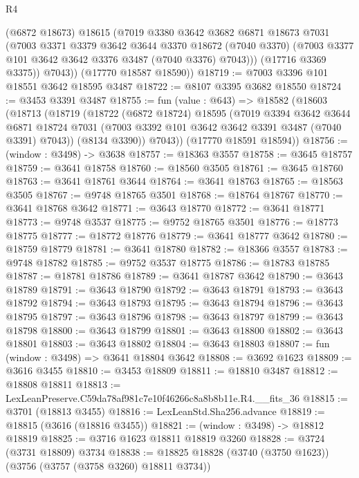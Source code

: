 \begin{lexlean}{R4}
\begin{coremodule}
            (@6872 @18673)
            @18615
            (@7019
              @3380
              @3642
              @3682
              @6871
              @18673
              @7031
              (@7003
                @3371
                @3379
                @3642
                @3644
                @3370
                @18672
                (@7040 @3370)
                (@7003 @3377 @101 @3642 @3642 @3376 @3487 (@7040 @3376) @7043)))
            (@17716 @3369 @3375))
          @7043))
      (@17770 @18587 @18590))
@18719 := @7003 @3396 @101 @18551 @3642 @18595 @3487
@18722 := @8107 @3395 @3682 @18550
@18724 := @3453 @3391 @3487
@18755 := fun (value : @643) =>
  @18582
    (@18603
      (@18713
        (@18719
          (@18722
            (@6872 @18724)
            @18595
            (@7019
              @3394
              @3642
              @3644
              @6871
              @18724
              @7031
              (@7003 @3392 @101 @3642 @3642 @3391 @3487 (@7040 @3391) @7043))
            (@8134 @3390))
          @7043))
      (@17770 @18591 @18594))
@18756 := (window : @3498) -> @3638
@18757 := @18363 @3557
@18758 := @3645 @18757
@18759 := @3641 @18758
@18760 := @18560 @3505
@18761 := @3645 @18760
@18763 := @3641 @18761 @3644
@18764 := @3641 @18763
@18765 := @18563 @3505
@18767 := @9748 @18765 @3501
@18768 := @18764 @18767
@18770 := @3641 @18768 @3642
@18771 := @3643 @18770
@18772 := @3641 @18771
@18773 := @9748 @3537
@18775 := @9752 @18765 @3501
@18776 := @18773 @18775
@18777 := @18772 @18776
@18779 := @3641 @18777 @3642
@18780 := @18759 @18779
@18781 := @3641 @18780
@18782 := @18366 @3557
@18783 := @9748 @18782
@18785 := @9752 @3537 @18775
@18786 := @18783 @18785
@18787 := @18781 @18786
@18789 := @3641 @18787 @3642
@18790 := @3643 @18789
@18791 := @3643 @18790
@18792 := @3643 @18791
@18793 := @3643 @18792
@18794 := @3643 @18793
@18795 := @3643 @18794
@18796 := @3643 @18795
@18797 := @3643 @18796
@18798 := @3643 @18797
@18799 := @3643 @18798
@18800 := @3643 @18799
@18801 := @3643 @18800
@18802 := @3643 @18801
@18803 := @3643 @18802
@18804 := @3643 @18803
@18807 := fun (window : @3498) => @3641 @18804 @3642
@18808 := @3692 @1623
@18809 := @3616 @3455
@18810 := @3453 @18809
@18811 := @18810 @3487
@18812 := @18808 @18811
@18813 := LexLeanPreserve.C59da78af981c7e10f46266c8a8b8b11e.R4.__fits_36
@18815 := @3701 (@18813 @3455)
@18816 := LexLeanStd.Sha256.advance
@18819 := @18815 (@3616 (@18816 @3455))
@18821 := (window : @3498) -> @18812 @18819
@18825 := @3716 @1623 @18811 @18819 @3260
@18828 := @3724 (@3731 @18809) @3734
@18838 := @18825 @18828 (@3740 (@3750 @1623)) (@3756 (@3757 (@3758 @3260) @18811 @3734))

\end{coremodule}
\end{lexlean}
